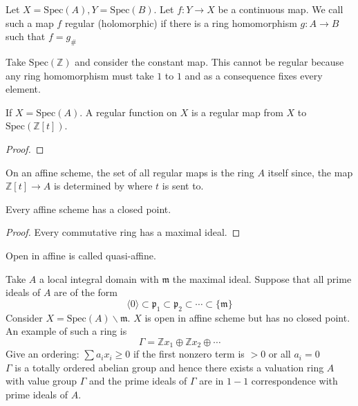 \documentclass[oneside, 12pt]{scrbook}
\newcommand{\ZZ}{\mathbb Z}
\newcommand{\spec}{\mathrm{Spec}}
\newcommand{\pr}{\mathfrak{p}}
\newcommand{\m}{\mathfrak{m}}
\theoremstyle{theorem}
\begin{document}
\begin{definition}
Let $X= \spec(A), Y = \spec(B)$. Let $f: Y \rightarrow X$ be a continuous map. We call such a map $f$ regular (holomorphic) if there is a ring homomorphism $g: A \rightarrow B$ such that $f = g_{\#}$
\end{definition}

\begin{example}
Take $\spec(\ZZ)$ and consider the constant map. This cannot be regular because any ring homomorphism must take $1$ to $1$ and as a consequence fixes every element. 
\end{example}

\begin{proposition}
If $X = \spec(A)$. A regular function on $X$ is a regular map from $X$ to $\spec(\ZZ[t])$.
\end{proposition}

\begin{proof}

\end{proof}

\begin{remark}
On an affine scheme, the set of all regular maps is the ring $A$ itself since, the map $\ZZ[t] \rightarrow A$ is determined by where $t$ is sent to. 
\end{remark}

\begin{lemma}
Every affine scheme has a closed point.
\end{lemma}

\begin{proof}
Every commutative ring has a maximal ideal. 
\end{proof}

\begin{definition}
Open in affine is called quasi-affine.
\end{definition}

\begin{example}
Take $A$ a local integral domain with $\m$ the maximal ideal. Suppose that all prime ideals of $A$ are of the form $$\langle 0 \rangle \subset \pr_{1} \subset \pr_{2} \subset \cdots \subset \{ \m \}$$ Consider $X = \spec(A) \backslash \m$. $X$ is open in affine scheme but has no closed point. \\

An example of such a ring is $$\Gamma = \ZZ x_{1} \oplus \ZZ x_{2} \oplus \cdots $$ Give an ordering: $\sum a_{i}x_{i} \geq 0$ if the first nonzero term is $>0$ or all $a_{i}=0$\\
$\Gamma$ is a totally ordered abelian group and hence there exists a valuation ring $A$ with value group $\Gamma$ and the prime ideals of $\Gamma$ are in $1-1$ correspondence with prime ideals of $A$.
\end{example}
\end{document}
